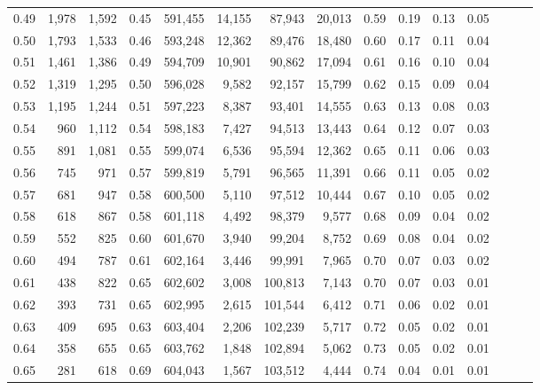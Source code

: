\begin{tabular}{rrrrrrrrrrrrrrr}
0.49 &   1,978 &  1,592 &  0.45 &  591,455 &   14,155 &   87,943 &   20,013 &  0.59 &  0.19 &  0.13 &      0.05 \\
0.50 &   1,793 &  1,533 &  0.46 &  593,248 &   12,362 &   89,476 &   18,480 &  0.60 &  0.17 &  0.11 &      0.04 \\
0.51 &   1,461 &  1,386 &  0.49 &  594,709 &   10,901 &   90,862 &   17,094 &  0.61 &  0.16 &  0.10 &      0.04 \\
0.52 &   1,319 &  1,295 &  0.50 &  596,028 &    9,582 &   92,157 &   15,799 &  0.62 &  0.15 &  0.09 &      0.04 \\
0.53 &   1,195 &  1,244 &  0.51 &  597,223 &    8,387 &   93,401 &   14,555 &  0.63 &  0.13 &  0.08 &      0.03 \\
0.54 &     960 &  1,112 &  0.54 &  598,183 &    7,427 &   94,513 &   13,443 &  0.64 &  0.12 &  0.07 &      0.03 \\
0.55 &     891 &  1,081 &  0.55 &  599,074 &    6,536 &   95,594 &   12,362 &  0.65 &  0.11 &  0.06 &      0.03 \\
0.56 &     745 &    971 &  0.57 &  599,819 &    5,791 &   96,565 &   11,391 &  0.66 &  0.11 &  0.05 &      0.02 \\
0.57 &     681 &    947 &  0.58 &  600,500 &    5,110 &   97,512 &   10,444 &  0.67 &  0.10 &  0.05 &      0.02 \\
0.58 &     618 &    867 &  0.58 &  601,118 &    4,492 &   98,379 &    9,577 &  0.68 &  0.09 &  0.04 &      0.02 \\
0.59 &     552 &    825 &  0.60 &  601,670 &    3,940 &   99,204 &    8,752 &  0.69 &  0.08 &  0.04 &      0.02 \\
0.60 &     494 &    787 &  0.61 &  602,164 &    3,446 &   99,991 &    7,965 &  0.70 &  0.07 &  0.03 &      0.02 \\
0.61 &     438 &    822 &  0.65 &  602,602 &    3,008 &  100,813 &    7,143 &  0.70 &  0.07 &  0.03 &      0.01 \\
0.62 &     393 &    731 &  0.65 &  602,995 &    2,615 &  101,544 &    6,412 &  0.71 &  0.06 &  0.02 &      0.01 \\
0.63 &     409 &    695 &  0.63 &  603,404 &    2,206 &  102,239 &    5,717 &  0.72 &  0.05 &  0.02 &      0.01 \\
0.64 &     358 &    655 &  0.65 &  603,762 &    1,848 &  102,894 &    5,062 &  0.73 &  0.05 &  0.02 &      0.01 \\
0.65 &     281 &    618 &  0.69 &  604,043 &    1,567 &  103,512 &    4,444 &  0.74 &  0.04 &  0.01 &      0.01 \\

\end{tabular}
